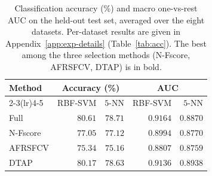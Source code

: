 \documentclass[]{interact}
\theoremstyle{plain}
\theoremstyle{definition}
\theoremstyle{remark}
\begin{document}
\begin{table}[htbp]
\centering\small
\caption{Classification accuracy (\%) and macro one-vs-rest AUC on the held-out test set, averaged over the eight datasets. Per-dataset results are given in Appendix~\ref{app:exp-details} (Table~\ref{tab:acc}). The best among the three selection methods (N-Fscore, AFRSFCV, DTAP) is in bold.}\label{tab:perf-summary}
\begin{tabular}{l rr rr}
\toprule
\multirow{2}{*}{Method} & \multicolumn{2}{c}{Accuracy (\%)} & \multicolumn{2}{c}{AUC} \\
\cmidrule(lr){2-3}\cmidrule(lr){4-5}
         & RBF-SVM          & $5$-NN           & RBF-SVM           & $5$-NN            \\
\midrule
Full     & $80.61$          & $78.71$          & $0.9164$          & $0.8870$          \\
N-Fscore & $77.05$          & $77.12$          & $0.8994$          & $0.8770$          \\
AFRSFCV  & $75.34$          & $75.16$          & $0.8807$          & $0.8759$          \\
DTAP     & $\mathbf{80.17}$ & $\mathbf{78.63}$ & $\mathbf{0.9136}$ & $\mathbf{0.8938}$ \\
\bottomrule
\end{tabular}
\end{table}
\end{document}
